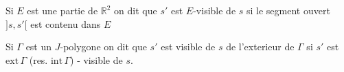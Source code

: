 %

%
\margin{\rule{.35pt}{1em}}%
Si $E$ est une partie de $\mathbb{R}^{2}$  on dit que $s'$ est $E$-visible de $s$ si le segment ouvert $]s,s'[$ est contenu dans $E$ 

\margin{\rule{.35pt}{1em}}Si $\Gamma$ est un $J$-polygone on dit que $s'$ est visible de $s$ de l'exterieur  de $\Gamma$ si $s'$ est $\mathrm{ext}\,\Gamma$ (res. $\mathrm{int}\,\Gamma$) - visible de $s$.\margin{\rule{.35pt}{1em}}
